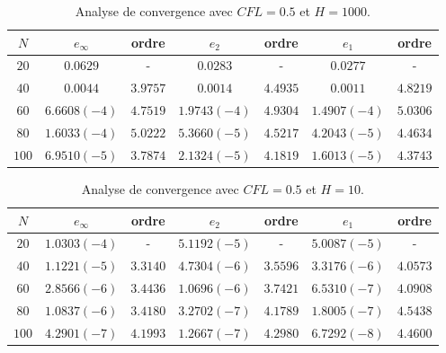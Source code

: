 \begin{table}[ht]
\begin{center}
\begin{tabular}{c|c|c|c|c|c|c}
$N$ & $e_{\infty}$ & ordre & $e_2$ & ordre & $e_1$ & ordre \\ 
\hline 
\hline
$20$ & $0.0629$ & - & $0.0283$ & - & $0.0277$ & - \\ 
\hline 
$40$ & $0.0044$ & $3.9757$ & $0.0014$ & $4.4935$ & $0.0011$ & $4.8219$ \\ 
\hline 
$60$ & $6.6608 (-4)$ & $4.7519$ & $1.9743 (-4)$ & $4.9304$ & $1.4907 (-4)$ & $5.0306$ \\
\hline 
$80$ & $1.6033 (-4)$ & $5.0222$ & $5.3660 (-5)$ & $4.5217$ & $4.2043 (-5)$ & $4.4634$ \\ 
\hline 
$100$ & $6.9510(-5)$ & $3.7874$ & $2.1324 (-5)$ & $4.1819$ & $1.6013 (-5)$ & $4.3743$  \\ 
\end{tabular} 
\caption{Analyse de convergence avec $CFL=0.5$ et $H=1000$.}
\label{CV_order4_hp1000}
\end{center}
\end{table}

\begin{table}[ht]
\begin{center}
\begin{tabular}{c|c|c|c|c|c|c}
$N$ & $e_{\infty}$ & ordre & $e_2$ & ordre & $e_1$ & ordre \\ 
\hline 
\hline
$20$ & $1.0303 (-4)$ & - & $5.1192 (-5)$ & - & $5.0087 (-5)$ & - \\ 
\hline 
$40$ & $1.1221 (-5)$ & $3.3140$ & $4.7304 (-6)$ & $3.5596$ & $3.3176 (-6)$ & $4.0573$ \\ 
\hline 
$60$ & $2.8566 (-6)$ & $3.4436$ & $1.0696 (-6)$ & $3.7421$ & $6.5310 (-7)$ & $4.0908$ \\
\hline 
$80$ & $1.0837 (-6)$ & $3.4180$ & $3.2702 (-7)$ & $4.1789$ & $1.8005 (-7)$ & $4.5438$ \\ 
\hline 
$100$ & $4.2901(-7)$ & $4.1993$ & $1.2667 (-7)$ & $4.2980$ & $6.7292 (-8)$ & $4.4600$  \\ 
\end{tabular} 
\caption{Analyse de convergence avec $CFL=0.5$ et $H=10$.}
\label{CV_order8_hp10}
\end{center}
\end{table}

